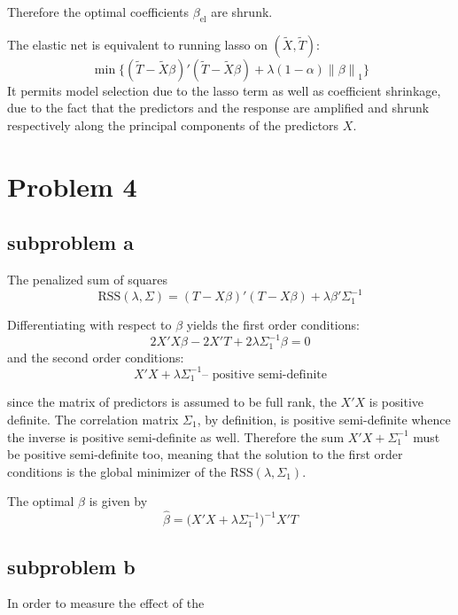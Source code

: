 \documentclass[a4paper]{article}
\newcommand{\nrm}[1]{{\left\| #1 \right \|}}
\newcommand{\RSS}{\text{RSS}}
\begin{document}
Therefore the optimal coefficients $\beta_{\text{el}}$ are shrunk.

The elastic net is equivalent to running lasso on $(\tilde{X}, \tilde{T})$:
\[\min\Big\{ (\tilde{T} - \tilde{X}\beta)'(\tilde{T} - \tilde{X}\beta) + \lambda(1-\alpha)\nrm{\beta}_1 \Big\}\]
It permits model selection due to the lasso term as well as coefficient shrinkage, due to the fact that the predictors and the response are amplified and shrunk respectively along the principal components of the predictors $X$.


\clearpage

\section{Problem 4} %
\label{sec:problem_4}

\subsection{subproblem a} %
\label{sub:subproblem_a}

The penalized sum of squares
\[\RSS(\lambda,\Sigma) = (T-X\beta)'(T-X\beta) + \lambda \beta'\Sigma_1^{-1}\]

Differentiating with respect to $\beta$ yields the first order conditions:
\[ 2 X'X\beta - 2 X'T + 2\lambda \Sigma_1^{-1}\beta = 0\]
and the second order conditions:
\[ X'X + \lambda \Sigma_1^{-1} \text{-- positive semi-definite}\]

since the matrix of predictors is assumed to be full rank, the $X'X$ is positive definite. The correlation matrix $\Sigma_1$, by definition, is positive semi-definite whence the inverse is positive semi-definite as well.
Therefore the sum $X'X + \Sigma_1^{-1}$ must be positive semi-definite too, meaning that the solution to the first order conditions is the global minimizer of the $\RSS(\lambda,\Sigma_1)$.

The optimal $\beta$ is given by
\[\hat{\beta} = \big(X'X + \lambda \Sigma_1^{-1}\big)^{-1}X'T\]


\subsection{subproblem b} %
\label{sub:subproblem_b}

In order to measure the effect of the 
\end{document}
